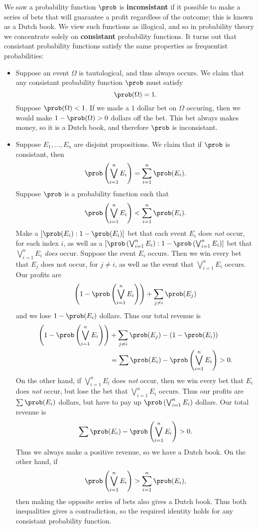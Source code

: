 We saw a probability function $\prob$ is {\bf inconsistant} if it possible to make a series of bets that will guarantee a profit regardless of the outcome; this is known as a Dutch book. We view such functions as illogical, and so in probability theory we concentrate solely on {\bf consistant} probability functions. It turns out that consistant probability functions satisfy the same properties as frequentist probabilities:
%
\begin{itemize}
    \item Suppose an event $\Omega$ is tautological, and thus always occurs. We claim that any consistant probability function $\prob$ must satisfy
    \[ \prob(\Omega) = 1. \]
    Suppose $\prob(\Omega) < 1$. If we made a $1$ dollar bet on $\Omega$ occuring, then we would make $1 - \prob(\Omega) > 0$ dollars off the bet. This bet always makes money, so it is a Dutch book, and therefore $\prob$ is inconsistant.

    \item Suppose $E_1, \dots, E_n$ are disjoint propositions. We claim that if $\prob$ is consistant, then
    \[ \prob \left( \bigvee_{i = 1}^n E_i \right) = \sum_{i = 1}^n \prob(E_i). \]
    Suppose $\prob$ is a probability function such that
    \[ \prob \left( \bigvee_{i = 1}^n E_i \right) < \sum_{i = 1}^n \prob(E_i). \]
    Make a $[\prob(E_i): 1 - \prob(E_i)]$ bet that each event $E_i$ does {\it not} occur, for each index $i$, as well as a $[\prob \left( \bigvee_{i = 1}^n E_i \right) : 1 - \prob \left( \bigvee_{i = 1}^n E_i \right)]$ bet that $\bigvee_{i = 1}^n E_i$ {\it does} occur. Suppose the event $E_i$ occurs. Then we win every bet that $E_j$ does not occur, for $j \neq i$, as well as the event that $\bigvee_{i = 1}^n E_i$ occurs. Our profits are
    \[ \left( 1 - \prob \left( \bigvee_{i = 1}^n E_i \right) \right) + \sum_{j \neq i} \prob(E_j) \]
    and we lose $1 - \prob(E_i)$ dollars. Thus our total revenue is
    \begin{align*}
        \left( 1 - \prob \left( \bigvee_{i = 1}^n E_i \right) \right)& + \sum_{j \neq i} \prob(E_j) - \left( 1 - \prob(E_i) \right)\\
        &= \sum \prob(E_i) - \prob \left( \bigvee_{i = 1}^n E_i \right) > 0.
    \end{align*}
    On the other hand, if $\bigvee_{i = 1}^n E_i$ does {\it not} occur, then we win every bet that $E_i$ does {\it not} occur, but lose the bet that $\bigvee_{i = 1}^n E_i$ occurs. Thus our profits are $\sum \prob(E_i)$ dollars, but have to pay up $\prob \left( \bigvee_{i = 1}^n E_i \right)$ dollars. Our total revenue is
    \[ \sum \prob(E_i) - \prob \left( \bigvee_{i = 1}^n E_i \right) > 0. \]
    Thus we always make a positive revenue, so we have a Dutch book. On the other hand, if
    \[ \prob \left( \bigvee_{i = 1}^n E_i \right) > \sum_{i = 1}^n \prob(E_i), \]
    then making the opposite series of bets also gives a Dutch book. Thus both inequalities gives a contradiction, so the required identity holds for any consistant probability function.
\end{itemize}
